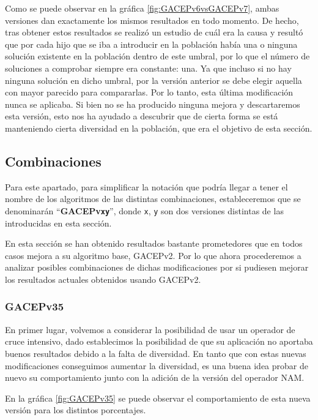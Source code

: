Como se puede observar en la gráfica \ref{fig:GACEPv6vsGACEPv7}, ambas versiones dan exactamente los mismos resultados en todo momento. 
De hecho, tras obtener estos resultados se realizó un estudio de cuál era la causa y resultó que por cada hijo que se iba a introducir en la población había una o ninguna solución existente en la población dentro de este umbral, por lo que el número de soluciones a comprobar siempre era constante: una. 
Ya que incluso si no hay ninguna solución en dicho umbral, por la versión anterior se debe elegir aquella con mayor parecido para compararlas. 
Por lo tanto, esta última modificación nunca se aplicaba. 
Si bien no se ha producido ninguna mejora y descartaremos esta versión, esto nos ha ayudado a descubrir que de cierta forma se está manteniendo cierta diversidad en la población, que era el objetivo de esta sección. 

\subsection{Combinaciones}

Para este apartado, para simplificar la notación que podría llegar a tener el nombre de los algoritmos de las distintas combinaciones, estableceremos que se denominarán ``\textbf{GACEPv\texttt{xy}}'', donde \texttt{x}, \texttt{y} son dos versiones distintas de las introducidas en esta sección. 

En esta sección se han obtenido resultados bastante prometedores que en todos casos mejora a su algoritmo base, GACEPv2. 
Por lo que ahora procederemos a analizar posibles combinaciones de dichas modificaciones por si pudiesen mejorar los resultados actuales obtenidos usando GACEPv2. 

\subsubsection{GACEPv35}

En primer lugar, volvemos a considerar la posibilidad de usar un operador de cruce intensivo, dado establecimos la posibilidad de que su aplicación no aportaba buenos resultados debido a la falta de diversidad. 
En tanto que con estas nuevas modificaciones conseguimos aumentar la diversidad, es una buena idea probar de nuevo su comportamiento junto con la adición de la versión del operador NAM. 

En la gráfica \ref{fig:GACEPv35} se puede observar el comportamiento de esta nueva versión para los distintos porcentajes.
 
